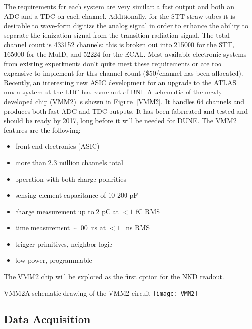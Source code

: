 The requirements for each system are very similar: a fast output and both an ADC %
and a TDC on each channel.  %
Additionally, for the STT straw tubes it 
is desirable to wave-form digitize the analog signal in order to enhance the ability to separate 
the ionization signal from the transition radiation signal.  
The total channel count is 433152 channels; this is broken out into 215000 for the  STT, 165000 for the
 MuID, and 52224 for the ECAL. Most available electronic systems from 
existing experiments don’t quite meet these requirements or are too expensive to implement 
for this channel count (\$50/channel has been allocated).  Recently, %
an interesting new ASIC development for an upgrade to the ATLAS muon system at the LHC %
has come out of BNL   %
 A schematic of the newly developed chip (VMM2) is shown in 
Figure~\ref{VMM2}.  It handles 64 channels and produces both fast ADC and TDC outputs.
It has been fabricated and tested and should be ready by 2017, long before it will be needed for DUNE. %
The VMM2 features are the following:
\begin{itemize}
\item front-end electronics (ASIC)
\item more than 2.3 million channels total
\item operation with both charge polarities
\item sensing element capacitance of 10-200 pF
\item charge measurement up to 2 pC at $< 1$ fC RMS
\item time measurement $\sim100$~ns at $< 1$ ~ns RMS
\item trigger primitives, neighbor logic
\item low power, programmable
\end{itemize}
The VMM2 chip will be explored  as the first option for the NND readout.  


\begin{cdrfigure}{VMM2}{A schematic drawing of the VMM2 circuit}
\texttt{[image: VMM2]}
\end{cdrfigure}


\subsection{Data Acquisition} %

